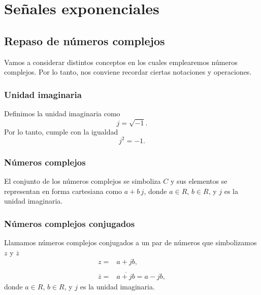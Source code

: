 % 
% 

\section{Se\~{n}ales exponenciales}

\subsection{Repaso de n\'{u}meros complejos}

Vamos a considerar distintos conceptos en los cuales emplearemos
n\'{u}meros complejos.  Por lo tanto, nos conviene recordar ciertas
notaciones y operaciones.

\subsubsection{Unidad imaginaria}

Definimos la unidad imaginaria como
\begin{equation}
  j = \sqrt{-1}.
\end{equation}
Por lo tanto, cumple con la igualdad
\begin{equation}
  j^{2} = -1.
\end{equation}

\subsubsection{N\'{u}meros complejos}

El conjunto de los n\'{u}meros complejos se simboliza $C$ y sus
elementos se representan en forma cartesiana como $a + b \, j$,
donde $a \in R$, $b \in R$, y $j$ es la unidad imaginaria.

\subsubsection{N\'{u}meros complejos conjugados}

Llamamos n\'{u}meros complejos conjugados a un par de n\'{u}meros que
simbolizamos $z$ y $\overline{z}$
\begin{equation}
  \begin{array}{ll}
    z =             &       a + j b,                        \\
    & \\
    \overline{z}    =       &       \overline{a + j b} = a - j b,
  \end{array}
\end{equation}
donde $a \in R$, $b \in R$, y $j$ es la unidad imaginaria.

